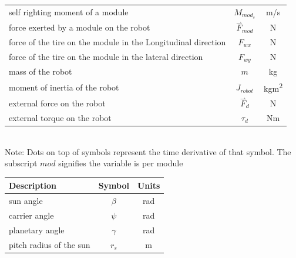 \documentclass{article}
\newcommand{\harpoon}{\overset{\rightharpoonup}}
\begin{document}
\begin{center}
\begin{tabular}{l c c}
        self righting moment of a module                              & $M_{mod_s}$            & m/s                    \\
        force exerted by a module on the robot                        & $\harpoon{F}_{mod}$    & N                      \\
        force of the tire on the module in the Longitudinal direction & $F_{wx}$               & N                      \\
        force of the tire on the module in the lateral direction      & $F_{wy}$               & N                      \\
        mass of the robot                                             & $m$                    & kg                     \\
        moment of inertia of the robot                                & $J_{robot}$            & kgm\textsuperscript{2} \\
        external force on the robot                                   & $\harpoon{F}_d$        & N                      \\
        external torque on the robot                                  & $\tau_d$               & Nm                     \\
        \bottomrule
    \end{tabular}
    \vspace{0.1cm}\\
    Note: Dots on top of symbols represent the time derivative of that symbol. The subscript $mod$ signifies the variable is per module
    \begin{tabular}{l c c}
        \toprule
        Description                                                               & Symbol        & Units                  \\
        \hline
        sun angle                                                                 & $\beta$       & rad                    \\
        carrier angle                                                             & $\psi$        & rad                    \\
        planetary angle                                                           & $\gamma$      & rad                    \\
        pitch radius of the sun                                                   & $r_s$         & m                      \\

\end{tabular}
\end{center}
\end{document}
